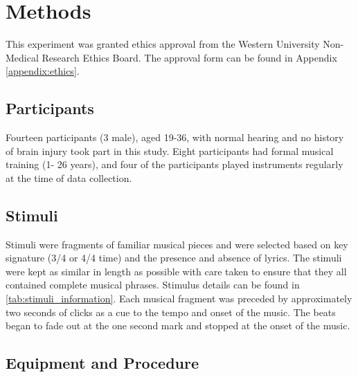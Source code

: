 \chapter{Methods}
This experiment was granted ethics approval from the Western University Non-Medical Research Ethics Board. 
The approval form can be found in Appendix \ref{appendix:ethics}.
\section{Participants}
Fourteen participants (3 male), aged 19-36, with normal hearing and no history of brain injury took part in this study. Eight participants had formal musical training (1- 26 years), and four of the participants played instruments regularly at the time of data collection.
\section{Stimuli}
Stimuli were fragments of familiar musical pieces and were selected based on key signature (3/4 or 4/4 time) and the presence and absence of lyrics. The stimuli were kept as similar in length as possible with care taken to ensure that they all contained complete musical phrases. Stimulus details can be found in \autoref{tab:stimuli_information}.
Each musical fragment was preceded by approximately two seconds of clicks as a cue to the tempo and onset of the music. The beats began to fade out at the one second mark and stopped at the onset of the music. 

\section{Equipment and Procedure}
